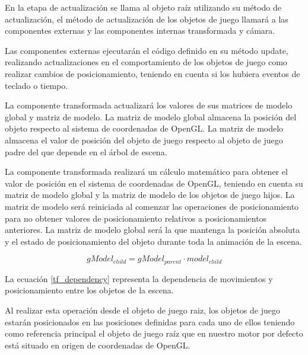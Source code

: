 \documentclass[a4paper, 17pt]{book}
\begin{document}
\vspace{1mm} %

En la etapa de actualización se llama al objeto raíz utilizando su método de actualización, el método de actualización de los objetos
de juego llamará a las componentes externas y las componentes internas transformada y cámara.

\vspace{1mm} %

Las componentes externas ejecutarán el código definido en su método update, realizando actualizaciones en el comportamiento de los objetos
de juego como realizar cambios de posicionamiento, teniendo en cuenta si los hubiera eventos de teclado o tiempo.

\vspace{1mm} %

La componente transformada actualizará los valores de sus matrices de modelo global y matriz de modelo. La matriz de modelo global almacena
la posición del objeto respecto al sistema de coordenadas de OpenGL. La matriz de modelo almacena el valor de posición del objeto de juego
respecto al objeto de juego padre del que depende en el árbol de escena.

\vspace{1mm} %

La componente transformada realizará un cálculo matemático para obtener el valor de posición en el sistema de coordenadas de OpenGL,
teniendo en cuenta su matriz de modelo global y la matriz de modelo de los objetos de juego hijos. La matriz de modelo será reiniciada
al comenzar las operaciones de posicionamiento para no obtener valores de posicionamiento relativos a posicionamientos anteriores.
La matriz de modelo global será la que mantenga la posición absoluta y el estado de posicionamiento del objeto durante toda la
animación de la escena.

\begin{equation} \label{tf_dependency}
gModel_{child} = gModel_{parent} \cdot model_{child}
\end{equation}

La ecuación \ref{tf_dependency} representa la dependencia de movimientos y posicionamiento entre los objetos de la escena.

\vspace{1mm} %

Al realizar esta operación desde el objeto de juego raiz, los objetos de juego estarán posicionados en las posiciones definidas para
cada uno de ellos teniendo como referencia principal el objeto de juego raíz que en nuestro motor por defecto está situado en origen
de coordenadas de OpenGL.
\end{document}
